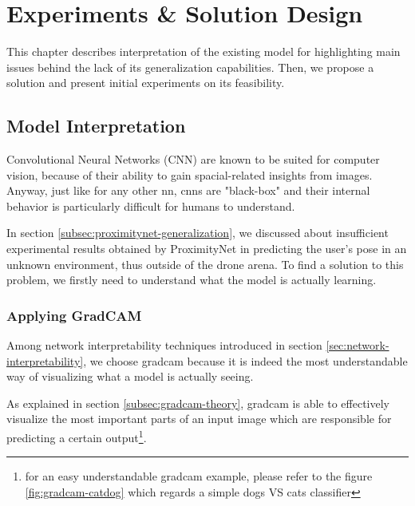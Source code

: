 \chapter{Experiments \& Solution Design}
\label{chap:design}


This chapter describes interpretation of the existing model for highlighting main issues behind the lack of its generalization capabilities. Then, we propose a solution and present initial experiments on its feasibility.




\section{Model Interpretation}
\label{sec:model-interpretration}


Convolutional Neural Networks (CNN) are known to be suited for computer vision, because of their ability to gain spacial-related insights from images. Anyway, just like for any other \gls{nn}, \gls{cnn}s are "black-box" and their internal behavior is particularly difficult for humans to understand.

In section \ref{subsec:proximitynet-generalization}, we discussed about insufficient experimental results obtained by ProximityNet in predicting the user's pose in an unknown environment, thus outside of the drone arena. To find a solution to this problem, we firstly need to understand what the model is actually learning.



\subsection{Applying GradCAM}
\label{subsec:gradcam-apply}


Among network interpretability techniques introduced in section \ref{sec:network-interpretability}, we choose \gls{gradcam} because it is indeed the most understandable way of visualizing what a model is actually seeing.

As explained in section \ref{subsec:gradcam-theory}, \gls{gradcam} is able to effectively visualize the most important parts of an input image which are responsible for predicting a certain output\footnote{for an easy understandable \gls{gradcam} example, please refer to the figure \ref{fig:gradcam-catdog} which regards a simple dogs VS cats classifier}.



